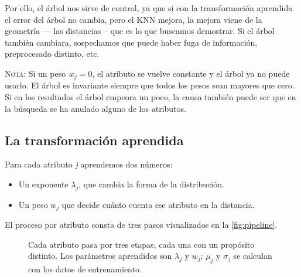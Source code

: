 Por ello, el árbol nos sirve de control, ya que si con la transformación aprendida el error del árbol no cambia, pero el KNN mejora, la mejora viene de la geometría --- las distancias -- que es lo que buscamos demostrar. Si el árbol también cambiara, sospechamos que puede haber fuga de información, preprocesado distinto, etc.

\textsc{Nota}: Si un peso $w_{j}=0$, el atributo se vuelve constante y el árbol ya no puede usarlo. El árbol es invariante siempre que todos los pesos sean mayores que cero. Si en los resultados el árbol empeora un poco, la causa también puede ser que en la búsqueda se ha anulado alguno de los atributos.

\subsection{La transformación aprendida}
Para cada atributo \textit{j} aprendemos dos números: 
\begin{itemize}
    \item Un exponente $\lambda_{j}$, que cambia la forma de la distribución. 
    \item Un peso $w_{j}$ que decide cuánto cuenta ese atributo en la distancia.
\end{itemize}

El proceso por atributo consta de tres pasos visualizados en la \autoref{fig:pipeline}.

\begin{figure}[htbp]
\centering
{}
\caption{Cada atributo pasa por tres etapas, cada una con un propósito distinto.
Los parámetros aprendidos son $\lambda_j$ y $w_j$; $\mu_j$ y $\sigma_j$ se
calculan con los datos de entrenamiento.}
\label{fig:pipeline}
\end{figure}

